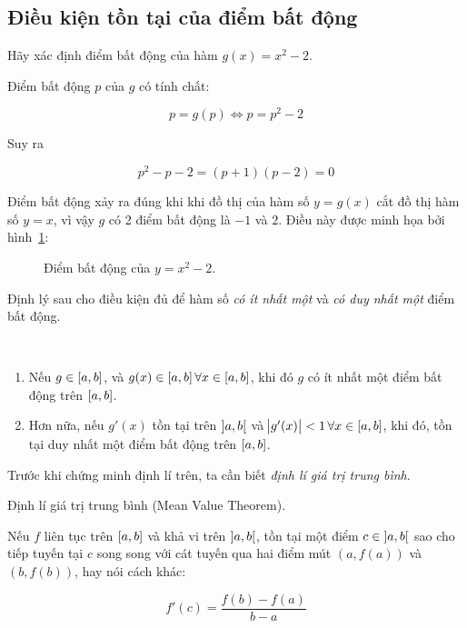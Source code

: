 \documentclass[../../Lectures]{subfiles}
\begin{document}
\subsection{Điều kiện tồn tại của điểm bất động}

\begin{exmp}
    Hãy xác định điểm bất động của hàm \(g(x) = x^2 - 2\).

    Điểm bất động \(p\) của \(g\) có tính chất:

    \[p= g(p) \iff p = p^2 - 2\]

    Suy ra

    \[p^2 - p - 2 = (p + 1)(p - 2) = 0\]

    Điểm bất động xảy ra đúng khi khi đồ thị của hàm số \(y = g(x)\) cắt đồ thị
    hàm số \(y = x\), vì vậy \(g\) có 2 điểm bất động là \(-1\) và \(2\). Điều
    này được minh họa bởi hình~\ref{fig:exmp_2.2_fixed_point}:

    \begin{figure}[!h]
        \centering
        
        \caption{Điểm bất động của \(y = x^2 - 2\).}
        \label{fig:exmp_2.2_fixed_point}    %
    \end{figure}
\end{exmp}

Định lý sau cho điều kiện đủ để hàm số \emph{có ít nhất một} và \emph{có duy
nhất một} điểm bất động.

\begin{theorem}\label{thm:sufficient_conditions_of_fixed_point}
\phantom\\
\begin{enumerate}
    \item Nếu \(g \in \interval{a}{b}\), và \(g(x) \in \interval{a}{b} \,
        \forall x \in \interval{a}{b}\), khi đó \(g\) có ít nhất một điểm bất
        động trên \(\interval{a}{b}\).
    \item Hơn nữa, nếu \(g'(x)\) tồn tại trên \(\interval[open]{a}{b}\) và
        \(\abs{g'(x)} < 1 \, \forall x \in \interval{a}{b}\), khi đó, tồn tại
        duy nhất một điểm bất động trên \(\interval{a}{b}\).
\end{enumerate}
\end{theorem}

Trước khi chứng minh định lí trên, ta cần biết \emph{định lí giá trị trung
bình}.

\begin{theorem}\label{thm:mean_value_theorem}
    Định lí giá trị trung bình (Mean Value Theorem).

    Nếu \(f\) liên tục trên \(\interval{a}{b}\) và khả vi trên
    \(\interval[open]{a}{b}\), tồn tại một điểm \(c \in \interval[open]{a}{b}\)
    sao cho tiếp tuyến tại \(c\) song song với cát tuyến qua hai điểm mút \((a,
    f(a))\) và \((b, f(b))\), hay nói cách khác:

    \[f'(c) = \frac{f(b) - f(a)}{b - a}\]
\end{theorem}
\end{document}

